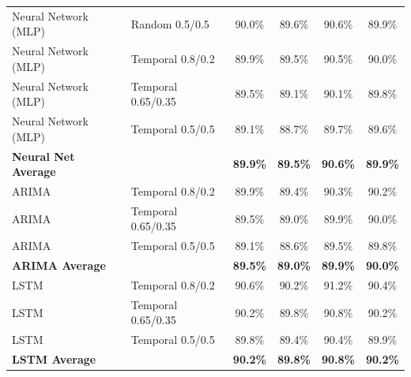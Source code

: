 \documentclass[11pt,a4paper]{article}
\begin{document}
\begin{table}[H]
\begin{tabular}{llcccc}
Neural Network (MLP) & Random 0.5/0.5 & 90.0\% & 89.6\% & 90.6\% & 89.9\% \\
Neural Network (MLP) & Temporal 0.8/0.2 & 89.9\% & 89.5\% & 90.5\% & 90.0\% \\
Neural Network (MLP) & Temporal 0.65/0.35 & 89.5\% & 89.1\% & 90.1\% & 89.8\% \\
Neural Network (MLP) & Temporal 0.5/0.5 & 89.1\% & 88.7\% & 89.7\% & 89.6\% \\
\textbf{Neural Net Average} & & \textbf{89.9\%} & \textbf{89.5\%} & \textbf{90.6\%} & \textbf{89.9\%} \\
\midrule
ARIMA & Temporal 0.8/0.2 & 89.9\% & 89.4\% & 90.3\% & 90.2\% \\
ARIMA & Temporal 0.65/0.35 & 89.5\% & 89.0\% & 89.9\% & 90.0\% \\
ARIMA & Temporal 0.5/0.5 & 89.1\% & 88.6\% & 89.5\% & 89.8\% \\
\textbf{ARIMA Average} & & \textbf{89.5\%} & \textbf{89.0\%} & \textbf{89.9\%} & \textbf{90.0\%} \\
\midrule
LSTM & Temporal 0.8/0.2 & 90.6\% & 90.2\% & 91.2\% & 90.4\% \\
LSTM & Temporal 0.65/0.35 & 90.2\% & 89.8\% & 90.8\% & 90.2\% \\
LSTM & Temporal 0.5/0.5 & 89.8\% & 89.4\% & 90.4\% & 89.9\% \\
\textbf{LSTM Average} & & \textbf{90.2\%} & \textbf{89.8\%} & \textbf{90.8\%} & \textbf{90.2\%} \\
\bottomrule
\end{tabular}
\end{table}
\end{document}
